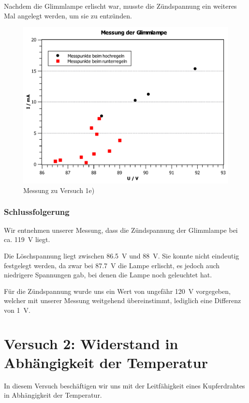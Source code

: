 \documentclass[11pt,a4paper,titlepage, ngerman]{article}
\begin{document}
				Nachdem die Glimmlampe erlischt war, musste die Zündspannung ein weiteres Mal angelegt werden, um sie zu entzünden.
			
				\begin{figure}
					\centering
					\includegraphics[width=\textwidth]{KennlinieGlimmlampe.pdf}
					\caption{Messung zu Versuch 1e)}
					\label{KL e}
				\end{figure}
			
			\subsubsection*{Schlussfolgerung}
			
				Wir entnehmen unserer Messung, dass die Zündspannung der Glimmlampe bei ca. \SI{119}{\V} liegt.
				
				Die Löschspannung liegt zwischen \SI{86,5}{\V} und \SI{88}{\V}. Sie konnte nicht eindeutig festgelegt werden, da zwar bei \SI{87,7}{\V} die Lampe erlischt, es jedoch auch niedrigere Spannungen gab, bei denen die Lampe noch geleuchtet hat.
				
				Für die Zündspannung wurde uns ein Wert von ungefähr \SI{120}{\V} vorgegeben, welcher mit unserer Messung weitgehend übereinstimmt, lediglich eine Differenz von \SI{1}{\V}.
					
	\newpage	
	\section{Versuch 2: Widerstand in Abhängigkeit der Temperatur}		
		
		In diesem Versuch beschäftigen wir uns mit der Leitfähigkeit eines Kupferdrahtes in Abhängigkeit der Temperatur.
		
\end{document}
